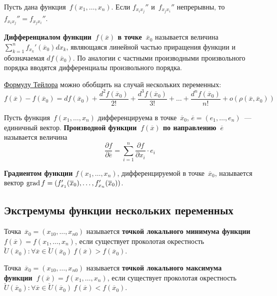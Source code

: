 \begin{theorem}[Шварца]
Пусть дана функция~$f(x_1, \ldots, x_n)$.
Если $f_{x_i x_j}''$ и~$f_{x_j x_i}''$ непрерывны, то $f_{x_i x_j}'' = f_{x_j x_i}''$.
\end{theorem}

\textbf{Дифференциалом функции~$f(\overline x)$ в точке~$\overline x_0$} называется величина $\sum\limits_{k=1}^n f_{x_k}'(\overline x_0) dx_k$, являющаяся линейной частью приращения функции и обозначаемая $df(\overline x_0)$.
По аналогии с частными производными произвольного порядка вводятся дифференциалы произвольного порядка.

\hyperref[eq:Taylor_series]{Формулу Тейлора} можно обобщить на случай нескольких переменных:
\begin{equation}
\label{eq:Taylor_series_for_several_variables}
f(\overline x) - f(\overline x_0) =
df(\overline x_0) + \frac{d^2 f(\overline x_0)}{2!} + \frac{d^3 f(\overline x_0)}{3!} + \ldots + \frac{d^n f(\overline x_0)}{n!} + o(\rho(\overline x, \overline x_0))
\end{equation}

 Пусть функция~$f(x_1, \ldots, x_n)$ дифференцируема в точке~$\overline x_0$, $\overline e = (e_1, \ldots, e_n)$~--- единичный вектор.
\textbf{Производной функции~$f(\overline x)$ по направлению~$\overline e$} называется величина
\begin{equation*}
\frac{\partial f}{\partial \overline e} = \sum_{i=1}^n \frac{\partial f}{\partial x_i} \cdot e_i
\end{equation*}

  \textbf{Градиентом функции $f(x_1, \ldots, x_n)$}, дифференцируемой в точке~$\overline x_0$, называется вектор $\operatorname{grad} f = (f_{x_1}'(\overline x_0), \ldots, \allowbreak f_{x_n}'(\overline x_0))$.

\subsection{Экстремумы функции нескольких переменных}
 Точка~$\overline x_0 = (x_{10}, \ldots, x_{n0})$ называется \textbf{точкой локального минимума функции~$f(\overline x) = f(x_1, \ldots, x_n)$}, если существует проколотая окрестность
$\breve U(\overline x_0) \colon \forall \overline x \in \breve U(\overline x_0) \
f(\overline x) > f(\overline x_0)$.
	
 Точка~$\overline x_0 = (x_{10}, \ldots, x_{n0})$ называется \textbf{точкой локального максимума функции~$f(\overline x) = f(x_1, \ldots, x_n)$}, если существует проколотая окрестность
$\breve U(\overline x_0) \colon \forall \overline x \in \breve U(\overline x_0) \
f(\overline x) < f(\overline x_0)$.

